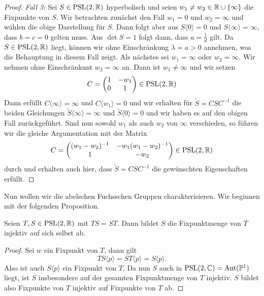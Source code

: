 \begin{proof}
  \emph{Fall 3:} Sei $S \in \operatorname{PSL}(2, \mathbb{R})$ hyperbolisch und seien $w_1
  \neq w_2 \in \mathbb{R} \cup \{\infty\}$ die Fixpunkte von $S$. Wir
  betrachten zunächst den Fall $w_1 = 0$ und $w_2 = \infty$ und wählen
  die obige Darstellung für $S$. Dann folgt aber aus $S\langle 0
  \rangle = 0$ und $S\langle \infty \rangle = \infty$, dass $b = c = 0$
  gelten muss. Aus $\det S = 1$ folgt dann, dass $a = \frac{1}{d}$
  gilt. Da $S \in \operatorname{PSL}(2,\mathbb{R})$ liegt, können wir ohne Einschränkung
  $\lambda = a > 0$ annehmen, was die Behauptung in diesem Fall
  zeigt. Als nächstes sei $w_1 = \infty$ oder $w_2 = \infty$. Wir
  nehmen ohne Einschränkunt $w_2 = \infty$ an. Dann ist $w_1 \neq
  \infty$ und wir setzen
  \[
  C =
  \begin{pmatrix}
    1 & - w_1\\
    0 & 1
  \end{pmatrix}
  \in \operatorname{PSL}(2, \mathbb{R})
  \]
  Dann erfüllt $C\langle \infty \rangle = \infty$ und $C\langle w_1
  \rangle = 0$ und wir erhalten für $\tilde S = C S C^{-1}$ die beiden
  Gleichungen $\tilde S \langle \infty \rangle = \infty$ und $\tilde S
  \langle 0 \rangle = 0$ und wir haben es auf den obigen Fall
  zurückgeführt. Sind nun sowohl $w_1$ als auch $w_2$ von $\infty$
  verschieden, so führen wir die gleiche Argumentation mit der Matrix
  \[
  C =
  \begin{pmatrix}
    (w_1 - w_2)^{-1} & - w_1(w_1-w_2)^{-1}\\
    1 & -w_2
  \end{pmatrix}
  \in \operatorname{PSL}(2, \mathbb{R})
  \]
  durch und erhalten auch hier, dass $\tilde S = C S C^{-1}$ die
  gewünschten Eigenschaften erfüllt.
\end{proof}

Nun wollen wir die abelschen Fuchsschen Gruppen charakterisieren. Wir
beginnen mit der folgenden Proposition.

\begin{prop}
  \label{prop:komm-fix}
  Seien $T, S \in \operatorname{PSL}(2, \mathbb{R})$ mit $TS = ST$. Dann bildet $S$ die
  Fixpunktmenge von $T$ injektiv auf sich selbst ab.
\end{prop}

\begin{proof}
  Sei $w$ ein Fixpunkt von $T$, dann gilt
  \[
  TS \langle p \rangle = ST\langle p \rangle = S\langle p \rangle.
  \]
  Also ist auch $S\langle p \rangle$ ein Fixpunkt von $T$. Da nun $S$
  auch in $\operatorname{PSL}(2, \mathbb{C}) = \operatorname{Aut}(\mathbb{P}^1)$ liegt, ist $S$ insbesondere auf
  der gesamten Fixpunktmenge von $T$ injektiv. $S$ bildet also
  Fixpunkte von $T$ injektiv auf Fixpunkte von $T$ ab.
\end{proof}

